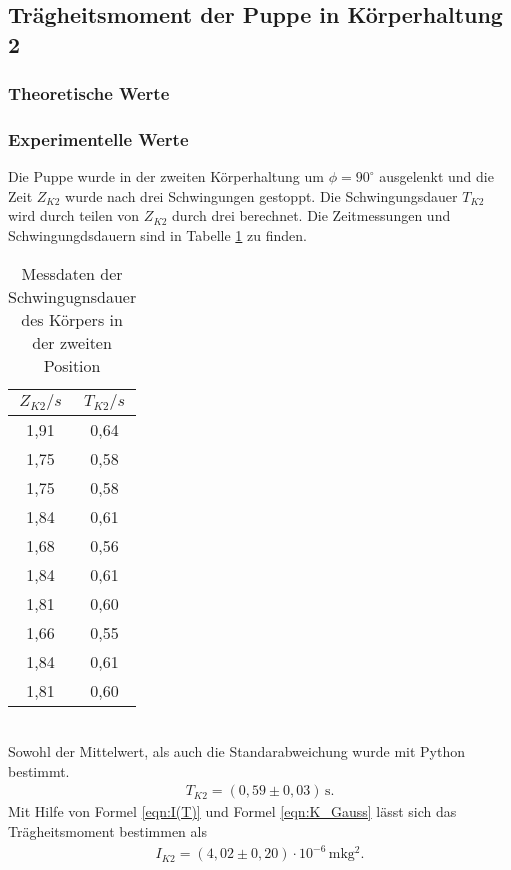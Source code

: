 \subsection{Trägheitsmoment der Puppe in Körperhaltung 2}
\label{TraegheitsmomentderPuppeinKoerperhaltung2}
\subsubsection{Theoretische Werte}

\subsubsection{Experimentelle Werte}
Die Puppe wurde in der zweiten Körperhaltung um $\phi = 90^{\circ}$ ausgelenkt und die Zeit $Z_{K2}$
wurde nach drei Schwingungen gestoppt. Die Schwingungsdauer $T_{K2}$ wird durch teilen von $Z_{K2}$
durch drei berechnet. Die Zeitmessungen und Schwingungdsdauern sind in Tabelle \ref{tab:Koerper2} zu finden.
\begin{table}
  \centering
  \caption{Messdaten der Schwingugnsdauer des Körpers in der zweiten Position}
  \label{tab:Koerper2}
  \begin{tabular}{c c}
    \toprule
    $Z_{K2}/s$ & $T_{K2}/s$ \\
    \midrule
    1,91 & 0,64 \\
    1,75 & 0,58 \\
    1,75 & 0,58 \\
    1,84 & 0,61 \\
    1,68 & 0,56 \\
    1,84 & 0,61 \\
    1,81 & 0,60 \\
    1,66 & 0,55 \\
    1,84 & 0,61 \\
    1,81 & 0,60 \\
    \bottomrule
  \end{tabular}
\end{table}
\\
Sowohl der Mittelwert, als auch die Standarabweichung wurde mit Python bestimmt.
\begin{align*}
  T_{K2} = (0{,}59 \pm 0{,}03)\, \mathrm{s} .
\end{align*}
Mit Hilfe von Formel \ref{eqn:I(T)} und Formel \ref{eqn:K_Gauss} lässt sich das Trägheitsmoment bestimmen als
\begin{align*}
  I_{K2} = (4{,}02 \pm 0{,}20) \cdot 10^{-6}\, \mathrm{mkg^2}.
\end{align*}

